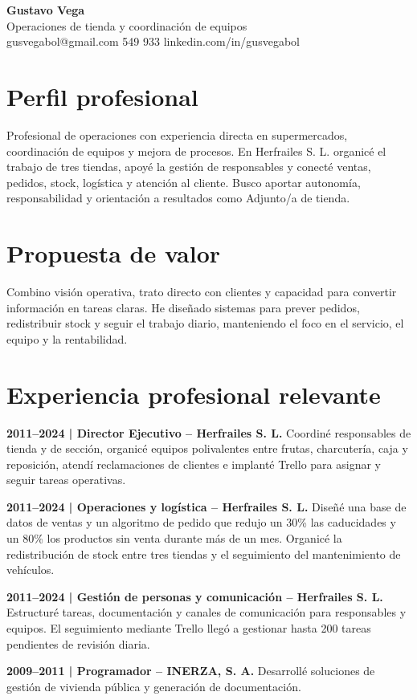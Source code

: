 \documentclass[11pt,a4paper]{article}
\begin{document}
\pagestyle{empty}
\begin{center}
{\Large\textbf{Gustavo Vega}}\\
Operaciones de tienda y coordinación de equipos\\
gusvegabol@gmail.com  549 933 \quad linkedin.com/in/gusvegabol
\end{center}
\section*{Perfil profesional}
Profesional de operaciones con experiencia directa en supermercados, coordinación de equipos y mejora de procesos. En Herfrailes S. L. organicé el trabajo de tres tiendas, apoyé la gestión de responsables y conecté ventas, pedidos, stock, logística y atención al cliente. Busco aportar autonomía, responsabilidad y orientación a resultados como Adjunto/a de tienda.
\section*{Propuesta de valor}
Combino visión operativa, trato directo con clientes y capacidad para convertir información en tareas claras. He diseñado sistemas para prever pedidos, redistribuir stock y seguir el trabajo diario, manteniendo el foco en el servicio, el equipo y la rentabilidad.
\section*{Experiencia profesional relevante}
\textbf{2011--2024 | Director Ejecutivo -- Herfrailes S. L.} Coordiné responsables de tienda y de sección, organicé equipos polivalentes entre frutas, charcutería, caja y reposición, atendí reclamaciones de clientes e implanté Trello para asignar y seguir tareas operativas.

\textbf{2011--2024 | Operaciones y logística -- Herfrailes S. L.} Diseñé una base de datos de ventas y un algoritmo de pedido que redujo un 30\% las caducidades y un 80\% los productos sin venta durante más de un mes. Organicé la redistribución de stock entre tres tiendas y el seguimiento del mantenimiento de vehículos.

\textbf{2011--2024 | Gestión de personas y comunicación -- Herfrailes S. L.} Estructuré tareas, documentación y canales de comunicación para responsables y equipos. El seguimiento mediante Trello llegó a gestionar hasta 200 tareas pendientes de revisión diaria.

\textbf{2009--2011 | Programador -- INERZA, S. A.} Desarrollé soluciones de gestión de vivienda pública y generación de documentación.
\end{document}
